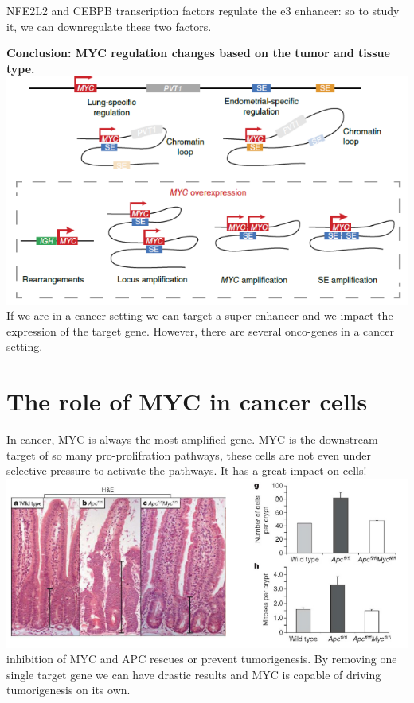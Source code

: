 NFE2L2 and CEBPB transcription factors regulate the e3 enhancer: so to study it, we can downregulate these two factors.

\textbf{Conclusion: MYC regulation changes based on the tumor and tissue type.}
\includegraphics{../_resources/732d6434382fbc8bdbd24c49c23cdaf7.png}
If we are in a cancer setting we can target a super-enhancer and we impact the expression of the target gene. However, there are several onco-genes in a cancer setting.

\hypertarget{the-role-of-myc-in-cancer-cells}{%
\section{The role of MYC in cancer cells}\label{the-role-of-myc-in-cancer-cells}}

In cancer, MYC is always the most amplified gene. MYC is the downstream target of so many pro-prolifration pathways, these cells are not even under selective pressure to activate the pathways.
It has a great impact on cells!
\includegraphics{../_resources/641af477cb65d73954e1ae24aab9a2ed.png}
inhibition of MYC and APC rescues or prevent tumorigenesis. By removing one single target gene we can have drastic results and MYC is capable of driving tumorigenesis on its own.

